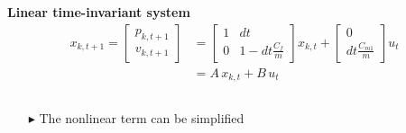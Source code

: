 \documentclass[9pt, aspectratio=169]{beamer}
\begin{document}
\begin{frame}[t]
\begin{columns}
\begin{column}{0.6\textwidth}
 \hspace{2.5cm}\textbf{Linear time-invariant system}
\begin{equation*}
    \begin{aligned}
    	x_{k,t+1} = 
    		\begin{bmatrix}
    			p_{k,t+1} \\
    			v_{k,t+1}
    		\end{bmatrix}
    		& =
    		\begin{bmatrix}
    			1 & dt \\
    			0 & 1-dt\frac{C_f}{m}
    		\end{bmatrix}
    		x_{k,t}
    		+
    		\begin{bmatrix}
    			0 \\
    			dt \frac{C_{m1}}{m}
    		\end{bmatrix}
    		u_t \\
    		& = A \, x_{k,t} + B \, u_t
    \end{aligned}
\end{equation*}
\end{column}
\end{columns}
\begin{columns}
\begin{column}{0.4\textwidth}
\vspace{-0.4cm}
 \begin{block}{}
\centering
{} \begin{itemize}
	\footnotesize
	\item[$\blacktriangleright$] The nonlinear term can be simplified
\end{itemize}
\end{block}
\end{column}
\begin{column}{0.49\textwidth}
\end{column}
\end{columns}
\end{frame}
\end{document}

